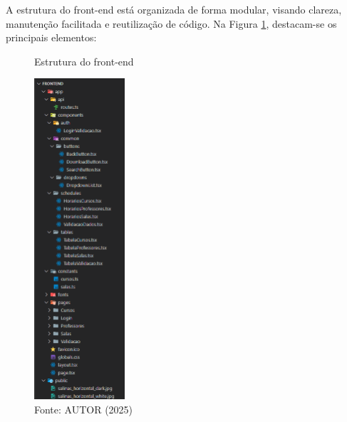 A estrutura do front-end está organizada de forma modular, visando clareza, manutenção facilitada e reutilização de código. Na Figura \ref{fig_front_14}, destacam-se os principais elementos:

\begin{figure}[htb]
    \centering
    \caption{Estrutura do front-end}
    \includegraphics[width=0.3\textwidth]{Figuras/front-14.png}
    \caption*{Fonte: AUTOR (2025)}
    \label{fig_front_14}
\end{figure}

